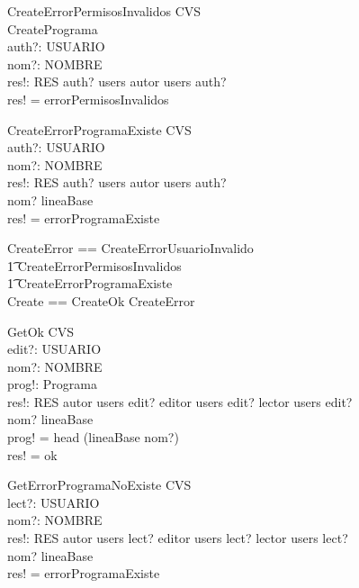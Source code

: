 \documentclass[a4paper, 12pt] {article}
\begin{document}
\begin{schema}{CreateErrorPermisosInvalidos}
\Xi CVS \\
CreatePrograma \\
auth?: USUARIO \\
nom?: NOMBRE \\
res!: RES
\where
auth? \in \dom users \land autor \notin users \: auth? \\
res! = errorPermisosInvalidos
\end{schema}

\begin{schema}{CreateErrorProgramaExiste}
\Xi CVS \\
auth?: USUARIO \\
nom?: NOMBRE \\
res!: RES
\where
auth? \in \dom users \land autor \in users \: auth? \\
nom? \in \dom lineaBase \\
res! = errorProgramaExiste
\end{schema}

\begin{zed}
CreateError == CreateErrorUsuarioInvalido \\
\t1 \lor CreateErrorPermisosInvalidos \\
\t1 \lor CreateErrorProgramaExiste \\
Create == CreateOk \lor CreateError
\end{zed}

\begin{schema}{GetOk}
\Xi CVS \\
edit?: USUARIO \\
nom?: NOMBRE \\
prog!: Programa \\
res!: RES
\where
autor \in users \: edit? \lor editor \in users \: edit? \lor lector \in users \: edit? \\
nom? \in \dom lineaBase \\
prog! = head (lineaBase \: nom?) \\
res! = ok
\end{schema}

\begin{schema}{GetErrorProgramaNoExiste}
\Xi CVS \\
lect?: USUARIO \\
nom?: NOMBRE \\
res!: RES
\where
autor \in users \: lect? \lor editor \in users \: lect? \lor lector \in users \: lect? \\
nom? \notin \dom lineaBase \\
res! = errorProgramaExiste
\end{schema}
\end{document}
